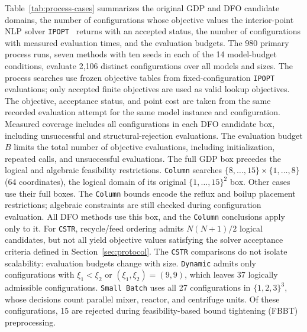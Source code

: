 \documentclass{article}
\begin{document}
Table~\ref{tab:process-cases} summarizes the original GDP and DFO candidate domains, the number of configurations whose objective values the interior-point NLP solver \texttt{IPOPT}~\citep{wachter2006implementation} returns with an accepted status, the number of configurations with measured evaluation times, and the evaluation budgets.
The 980 primary process runs, seven methods with ten seeds in each of the 14 model-budget conditions, evaluate 2,106 distinct configurations over all models and sizes.
The process searches use frozen objective tables from fixed-configuration \texttt{IPOPT} evaluations; only accepted finite objectives are used as valid lookup objectives.
The objective, acceptance status, and point cost are taken from the same recorded evaluation attempt for the same model instance and configuration.
Measured coverage includes all configurations in each DFO candidate box, including unsuccessful and structural-rejection evaluations.
The evaluation budget \(B\) limits the total number of objective evaluations, including initialization, repeated calls, and unsuccessful evaluations.
The full GDP box precedes the logical and algebraic feasibility restrictions.
\texttt{Column} searches \(\{8,\ldots,15\}\times\{1,\ldots,8\}\) (64 coordinates), the logical domain of its original \(\{1,\ldots,15\}^{2}\) box.
Other cases use their full boxes.
The \texttt{Column} bounds encode the reflux and boilup placement restrictions; algebraic constraints are still checked during configuration evaluation.
All DFO methods use this box, and the \texttt{Column} conclusions apply only to it.
For \texttt{CSTR}, recycle/feed ordering admits \(N(N+1)/2\) logical candidates, but not all yield objective values satisfying the solver acceptance criteria defined in Section~\ref{sec:protocol}.
The \texttt{CSTR} comparisons do not isolate scalability: evaluation budgets change with size.
\texttt{Dynamic} admits only configurations with \(\xi_1<\xi_2\) or \((\xi_1,\xi_2)=(9,9)\), which leaves 37 logically admissible configurations.
\texttt{Small Batch} uses all 27 configurations in \(\{1,2,3\}^{3}\), whose decisions count parallel mixer, reactor, and centrifuge units.
Of these configurations, 15 are rejected during feasibility-based bound tightening (FBBT) preprocessing.
\end{document}
